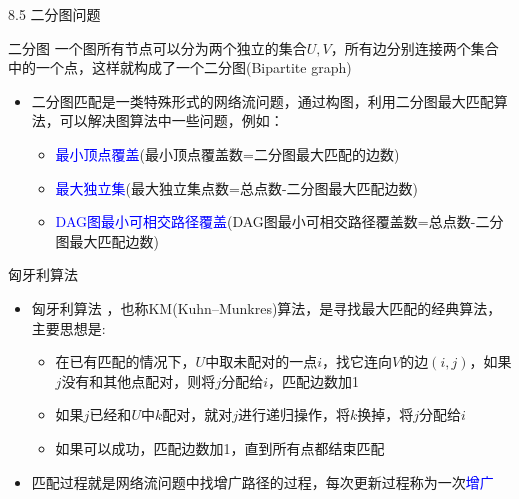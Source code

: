 \begin{frame}{8.5 二分图问题}
    \begin{block}{二分图}
        一个图所有节点可以分为两个独立的集合$U,V$，所有边分别连接两个集合中的一个点，这样就构成了一个二分图(Bipartite graph)
    \end{block}
    \begin{itemize}
        \item 二分图匹配是一类特殊形式的网络流问题，通过构图，利用二分图最大匹配算法，可以解决图算法中一些问题，例如：
        \vfill
        \begin{itemize}
            \item \textcolor{blue}{最小顶点覆盖}(最小顶点覆盖数=二分图最大匹配的边数)
            \item \textcolor{blue}{最大独立集}(最大独立集点数=总点数-二分图最大匹配边数)
            \item \textcolor{blue}{DAG图最小可相交路径覆盖}(DAG图最小可相交路径覆盖数=总点数-二分图最大匹配边数)
        \end{itemize} 
    \end{itemize}
\end{frame}
\begin{frame}{匈牙利算法}
    \begin{itemize}
        \item 匈牙利算法 ，也称KM(Kuhn–Munkres)算法，是寻找最大匹配的经典算法， 主要思想是:
        \begin{itemize}
            \item 在已有匹配的情况下，$U$中取未配对的一点$i$，找它连向$V$的边$(i,j)$，如果$j$没有和其他点配对，则将$j$分配给$i$，匹配边数加1
            \item 如果$j$已经和$U$中$k$配对，就对$j$进行递归操作，将$k$换掉，将$j$分配给$i$
            \item 如果可以成功，匹配边数加1，直到所有点都结束匹配
        \end{itemize}
        \vfill
        \item 匹配过程就是网络流问题中找增广路径的过程，每次更新过程称为一次\textcolor{blue}{增广}
    \end{itemize}
\end{frame}
